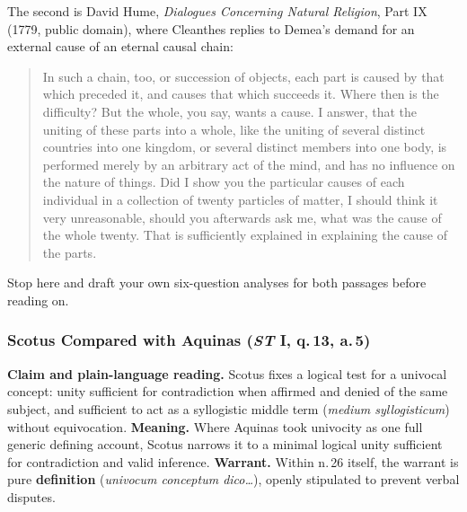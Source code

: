 The second is David Hume, \emph{Dialogues Concerning Natural Religion}, Part IX (1779, public domain), where Cleanthes replies to Demea's demand for an external cause of an eternal causal chain:

\begin{quote}
In such a chain, too, or succession of objects, each part is caused by that which preceded it, and causes that which succeeds it. Where then is the difficulty? But the whole, you say, wants a cause. I answer, that the uniting of these parts into a whole, like the uniting of several distinct countries into one kingdom, or several distinct members into one body, is performed merely by an arbitrary act of the mind, and has no influence on the nature of things. Did I show you the particular causes of each individual in a collection of twenty particles of matter, I should think it very unreasonable, should you afterwards ask me, what was the cause of the whole twenty. That is sufficiently explained in explaining the cause of the parts.
\end{quote}

Stop here and draft your own six-question analyses for both passages before reading on.

\subsubsection*{Scotus Compared with Aquinas (\emph{ST} I, q.\,13, a.\,5)}

\textbf{Claim and plain-language reading.} Scotus fixes a logical test for a univocal concept: unity sufficient for contradiction when affirmed and denied of the same subject, and sufficient to act as a syllogistic middle term (\emph{medium syllogisticum}) without equivocation. \textbf{Meaning.} Where Aquinas took univocity as one full generic defining account, Scotus narrows it to a minimal logical unity sufficient for contradiction and valid inference. \textbf{Warrant.} Within n.\,26 itself, the warrant is pure \textbf{definition} (\emph{univocum conceptum dico\dots}), openly stipulated to prevent verbal disputes.

